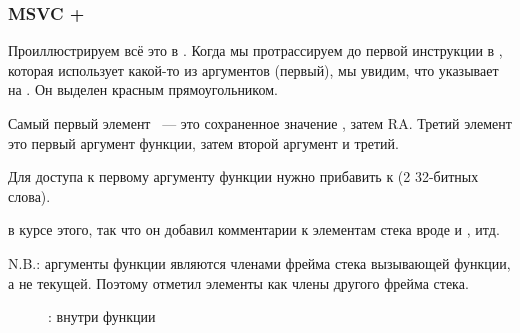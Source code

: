 \subsubsection{MSVC + \olly}
\myindex{\olly}
Проиллюстрируем всё это в \olly.
Когда мы протрассируем до первой инструкции в \ttf, которая использует какой-то из аргументов
(первый), мы увидим, что \EBP указывает на . Он выделен красным прямоугольником.

Самый первый элемент ~--- это сохраненное значение \EBP, 
затем \ac{RA}. Третий элемент это первый аргумент функции, затем второй аргумент и третий.

Для доступа к первому аргументу функции нужно прибавить к  (2 32-битных слова).

\olly в курсе этого, так что он добавил комментарии к элементам стека вроде
 и , итд.

N.B.: аргументы функции являются членами фрейма стека вызывающей функции, а не текущей.
Поэтому \olly отметил элементы  как члены другого фрейма стека.

\begin{figure}[H]
\centering
{}
\caption{\olly: внутри функции \ttf{}}
\label{fig:passing_arguments_olly}
\end{figure}
